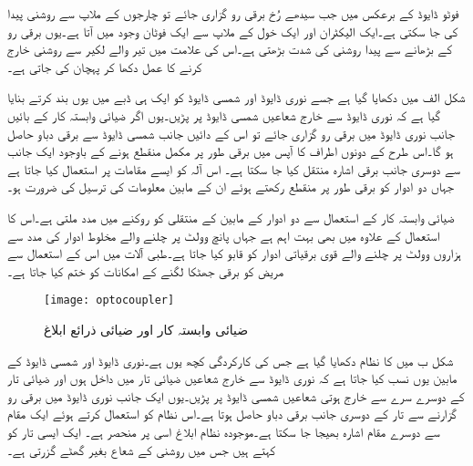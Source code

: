فوٹو ڈایوڈ کے برعکس   میں جب سیدھے رُخ برقی رو گزاری جائے تو  چارجوں کے ملاپ سے روشنی پیدا کی جا سکتی ہے۔ایک الیکٹران اور ایک خول کے ملاپ سے ایک فوٹان وجود میں آتا ہے۔یوں برقی رو کے بڑھانے سے پیدا روشنی کی شدت بڑھتی ہے۔اس کی علامت میں تیر والے لکیر سے روشنی خارج کرنے کا عمل دکھا کر پہچان کی جاتی ہے۔

شکل  الف میں   دکھایا گیا ہے جسے نوری ڈایوڈ اور شمسی ڈایوڈ کو ایک ہی ڈبے میں یوں بند کرتے بنایا گیا ہے کہ نوری ڈایوڈ سے خارج شعاعیں شمسی ڈایوڈ پر پڑیں۔یوں اگر ضیائی وابستہ کار کے بائیں جانب نوری ڈایوڈ میں برقی رو گزاری جائے تو اس کے دائیں جانب شمسی ڈایوڈ سے برقی دباو حاصل ہو گا۔اس طرح  کے دونوں اطراف کا آپس میں برقی طور پر مکمل منقطع ہونے کے باوجود ایک جانب سے دوسری جانب برقی اشارہ منتقل کیا جا سکتا  ہے۔ اس آلہ کو ایسے مقامات پر استعمال کیا جاتا ہے جہاں دو ادوار کو برقی طور پر منقطع رکھتے ہوئے ان کے مابین معلومات کی ترسیل کی ضرورت ہو۔

ضیائی وابستہ کار کے استعمال سے دو ادوار کے مابین  کے منتقلی کو روکنے میں مدد ملتی ہے۔اس کا استعمال  کے علاوہ   میں بھی بہت اہم ہے جہاں پانچ وولٹ پر چلنے والے مخلوط ادوار کی مدد سے ہزاروں وولٹ پر چلنے والے قوی برقیاتی ادوار کو قابو کیا جاتا ہے۔طبی آلات میں اس کے استعمال سے مریض کو برقی جھٹکا لگنے کے امکانات کو ختم کیا جاتا ہے۔
\begin{figure}
\centering
\texttt{[image: optocoupler]}
\caption{ضیائی وابستہ کار اور ضیائی ذرائع ابلاغ}
\label{شکل_ضیائی_وابستہ_کار}
\end{figure}
شکل  ب میں   کا نظام دکھایا گیا ہے جس کی کارکردگی کچھ یوں ہے۔نوری ڈایوڈ اور شمسی ڈایوڈ کے مابین  یوں نسب کیا جاتا ہے کہ نوری ڈایوڈ سے خارج شعاعیں ضیائی تار میں داخل ہوں اور ضیائی تار کے دوسرے سرے سے خارج ہوتی شعاعیں شمسی ڈایوڈ پر پڑیں۔یوں ایک جانب نوری ڈایوڈ میں برقی رو گزارنے سے تار کے دوسری جانب برقی دباو حاصل ہوتا ہے۔اس نظام کو استعمال کرتے ہوئے ایک مقام سے دوسرے مقام اشارہ بھیجا جا سکتا ہے۔موجودہ نظام ابلاغ اسی پر منحصر ہے۔ ایک ایسی تار کو کہتے ہیں جس میں روشنی کے شعاع بغیر گھٹے گزرتی ہے۔ 

